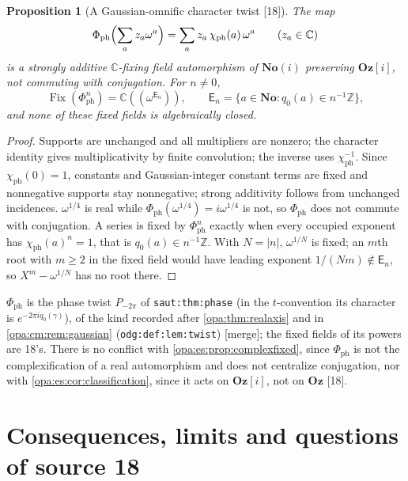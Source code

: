 \documentclass[11pt,oneside]{article}
\numberwithin{equation}{section}
\newtheorem{proposition}[proposition]{Proposition}
\theoremstyle{definition}
\theoremstyle{remark}
\newcommand{\No}{\mathbf{No}}
\newcommand{\Oz}{\mathbf{Oz}}
\newcommand{\Og}{\mathbf{Oz}[i]}
\newcommand{\SC}{\mathbf{No}(i)}
\newcommand{\C}{\mathbb C}
\newcommand{\Z}{\mathbb Z}
\newcommand{\Fix}{\operatorname{Fix}}
\newcommand{\src}[1]{\textup{\textsf{\small[#1]}}}
\newcommand{\mergetag}{\textup{\textsf{\small[merge]}}}
\newcommand{\lbl}[1]{\nolinkurl{#1}}
\begin{document}
\begin{proposition}[A Gaussian-omnific character twist \src{18}]\label{opa:es:prop:character}
The map
\begin{equation}\label{opa:es:eq:character}
 \Phi_{\mathrm{ph}}\Bigl(\sum_az_a\omega^a\Bigr)=\sum_az_a\,\chi_{\mathrm{ph}}(a)\,\omega^a\qquad(z_a\in\C)
\end{equation}
is a strongly additive $\C$-fixing field automorphism of $\SC$ preserving $\Og$, not commuting with conjugation. For $n\ne0$,
\begin{equation}\label{opa:es:eq:characterfixed}
 \Fix(\Phi_{\mathrm{ph}}^n)=\C((\omega^{\mathsf E_n})),\qquad \mathsf E_n=\{a\in\No:q_0(a)\in n^{-1}\Z\},
\end{equation}
and none of these fixed fields is algebraically closed.
\end{proposition}
\begin{proof}
Supports are unchanged and all multipliers are nonzero; the character identity gives multiplicativity by finite convolution; the inverse uses
$\chi_{\mathrm{ph}}^{-1}$. Since $\chi_{\mathrm{ph}}(0)=1$, constants and Gaussian-integer constant terms are fixed and nonnegative supports stay
nonnegative; strong additivity follows from unchanged incidences. $\omega^{1/4}$ is real while $\Phi_{\mathrm{ph}}(\omega^{1/4})=i\omega^{1/4}$ is not,
so $\Phi_{\mathrm{ph}}$ does not commute with conjugation. A series is fixed by $\Phi_{\mathrm{ph}}^n$ exactly when every occupied exponent has
$\chi_{\mathrm{ph}}(a)^n=1$, that is $q_0(a)\in n^{-1}\Z$. With $N=|n|$, $\omega^{1/N}$ is fixed; an $m$th root with $m\ge2$ in the fixed field would
have leading exponent $1/(Nm)\notin\mathsf E_n$, so $X^m-\omega^{1/N}$ has no root there.
\end{proof}

$\Phi_{\mathrm{ph}}$ is the phase twist $P_{-2\pi}$ of \lbl{saut:thm:phase} (in the $t$-convention its character is $e^{-2\pi iq_0(\gamma)}$), of the
kind recorded after \cref{opa:thm:realaxis} and in \cref{opa:cm:rem:gaussian} (\lbl{odg:def:lem:twist}) \mergetag; the fixed fields of its powers
are 18's. There is no conflict with \cref{opa:es:prop:complexfixed}, since $\Phi_{\mathrm{ph}}$ is not the complexification of a real automorphism
and does not centralize conjugation, nor with \cref{opa:es:cor:classification}, since it acts on $\Og$, not on $\Oz$ \src{18}.

\section{Consequences, limits and questions of source 18}\label{opa:es:sec:questions}
\end{document}
